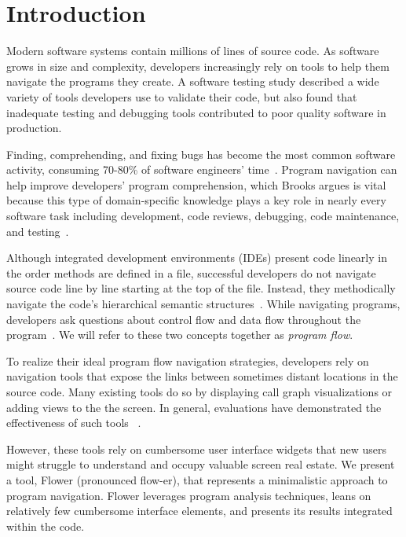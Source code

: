 \documentclass[conference]{IEEEtran}
\begin{document}



\IEEEpeerreviewmaketitle


\section{Introduction}
Modern software systems contain millions of lines of source code. 
As software grows in size and complexity, developers increasingly rely on tools to help them navigate the programs they create. 
A software testing study described a wide variety of tools developers use to validate their code, but also found that inadequate testing and debugging tools contributed to poor quality software in production\cite{NIST-02-3}.

Finding, comprehending, and fixing bugs has become the most common software activity, consuming 70-80\% of software engineers' time~\cite{Whyline}. 
Program navigation can help improve developers' program comprehension, which Brooks argues is vital because this type of domain-specific knowledge plays a key role in nearly every software task including development, code reviews, debugging, code maintenance, and testing~\cite{BrooksComprehension}. 

Although integrated development environments (IDEs) present code linearly in the order methods are defined in a file, successful developers do not navigate source code line by line starting at the top of the file. 
Instead, they methodically navigate the code's hierarchical semantic structures~\cite{robillard2004investigate}.
While navigating programs, developers ask questions about control flow and data flow throughout the program~\cite{latoza2010hard, Smith2015}. 
We will refer to these two concepts together as \textit{program flow}. 

To realize their ideal program flow navigation strategies, developers rely on navigation tools that expose the links between sometimes distant locations in the source code. 
Many existing tools do so by displaying call graph visualizations or adding views to the the screen.
In general, evaluations have demonstrated the effectiveness of such tools ~\cite{Reacher,Whyline,Relo,Stacksplorer}.

However, these tools rely on cumbersome user interface widgets that new users might struggle to understand and occupy valuable screen real estate.
We present a tool, Flower (pronounced flow-er), that represents a minimalistic approach to program navigation.
Flower  leverages program analysis techniques, leans on relatively few cumbersome interface elements, and presents its results integrated within the code.
\end{document}
